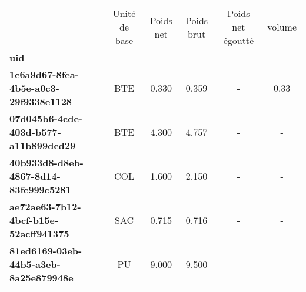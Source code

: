 \begin{tabular}{lccccc}
\toprule
{} & Unité de base &  Poids net &  Poids brut &  Poids net égoutté &  volume \\
\textbf{uid                                 } &               &            &             &                    &         \\
\midrule
\textbf{1c6a9d67-8fea-4b5e-a0c3-29f9338e1128} &           BTE &      0.330 &       0.359 &                  - &    0.33 \\
\textbf{07d045b6-4cde-403d-b577-a11b899dcd29} &           BTE &      4.300 &       4.757 &                  - &       - \\
\textbf{40b933d8-d8eb-4867-8d14-83fc999c5281} &           COL &      1.600 &       2.150 &                  - &       - \\
\textbf{ae72ae63-7b12-4bcf-b15e-52acff941375} &           SAC &      0.715 &       0.716 &                  - &       - \\
\textbf{81ed6169-03eb-44b5-a3eb-8a25e879948e} &            PU &      9.000 &       9.500 &                  - &       - \\
\bottomrule
\end{tabular}
